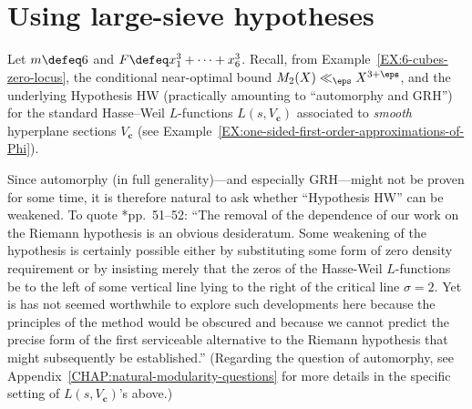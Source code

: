 \documentclass[12pt]{report}
\begin{document}





\section{Using large-sieve hypotheses}
\label{SEC:using-L-function-hypotheses-on-average}

Let $m\defeq 6$ and $F\defeq x_1^3+\dots+x_6^3$.
Recall, from Example~\ref{EX:6-cubes-zero-locus},
the conditional near-optimal bound $M_2(X)\ll_\eps X^{3+\eps}$, and the underlying Hypothesis HW (practically amounting to ``automorphy and GRH'') for the standard Hasse--Weil $L$-functions $L(s,V_{\bm{c}})$ associated to \emph{smooth} hyperplane sections $V_{\bm{c}}$ (see Example~\ref{EX:one-sided-first-order-approximations-of-Phi}).

Since automorphy (in full generality)---and especially GRH---might not be proven for some time,
it is therefore natural to ask whether ``Hypothesis HW'' can be weakened.
To quote \cite{hooley1986HasseWeil}*{pp.~51--52}:
``The removal of the dependence of our work on the Riemann hypothesis is an obvious desideratum.
Some weakening of the hypothesis is certainly possible either by substituting some form of zero density requirement or by insisting merely that the zeros of the Hasse-Weil $L$-functions be to the left of some vertical line lying to the right of the critical line $\sigma=2$.
Yet is has not seemed worthwhile to explore such developments here because the principles of the method would be obscured and because we cannot predict the precise form of the first serviceable alternative to the Riemann hypothesis that might subsequently be established.''
(Regarding the question of automorphy, see Appendix~\ref{CHAP:natural-modularity-questions} for more details in the specific setting of $L(s,V_{\bm{c}})$'s above.)
\end{document}
